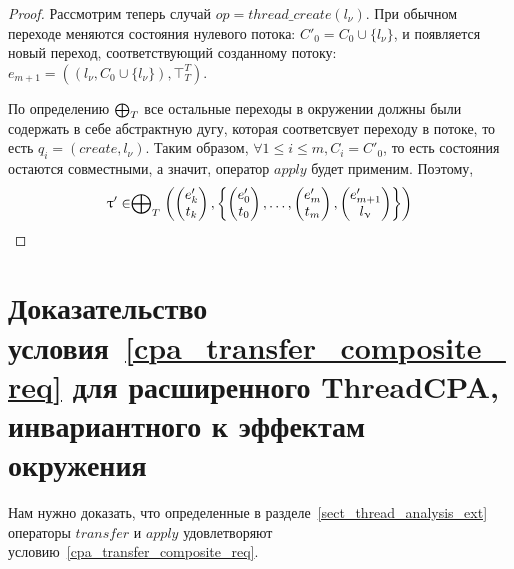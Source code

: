 \begin{proof}
Рассмотрим теперь случай $op = thread\_create(l_{\nu})$.
При обычном переходе меняются состояния нулевого потока: $C'_0 = C_0 \cup \{l_{\nu}\}$, и появляется новый переход, соответствующий созданному потоку: $e_{m+1} = ((l_{\nu},C_0 \cup \{l_{\nu}\}) , \top^T_T)$.

По определению $\mathrel{\bigoplus}_T$ все остальные переходы в окружении должны были содержать в себе абстрактную дугу, которая соответсвует переходу в потоке, то есть $q_i = (create, l_{\nu})$.
Таким образом, $\forall 1 \le i \le m, C_i = C'_0$, то есть состояния остаются совместными, а значит, оператор $apply$ будет применим.
Поэтому, 
$$\uptau' \in  \mathrel{\bigoplus}_{T}
\left(
\begin{pmatrix}
e'_k \\
t_k 
\end{pmatrix},
\left\{
\begin{pmatrix}
e'_0 \\
t_0 
\end{pmatrix},
\dots ,
\begin{pmatrix}
e'_m \\
t_m 
\end{pmatrix} ,
\begin{pmatrix}
e'_{m+1} \\
l_{\upnu} 
\end{pmatrix}
\right\}
\right)$$

\end{proof}


\section{Доказательство условия~\ref{cpa_transfer_composite_req} для расширенного ThreadCPA, инвариантного к эффектам окружения}
\label{sect_transfer_thread_ext_proof}

Нам нужно доказать, что определенные в разделе~\ref{sect_thread_analysis_ext} операторы $transfer$ и $apply$ удовлетворяют условию~\ref{cpa_transfer_composite_req}.

